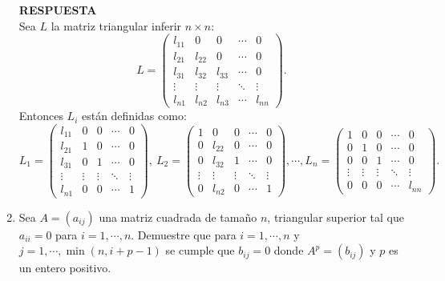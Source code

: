\documentclass[11pt,letterpaper]{article}
\newcommand{\res}{\textbf{RESPUESTA}\\}
\begin{document}
\begin{enumerate}
\res
Sea $L$ la matriz triangular inferir $n\times n$:
\begin{equation*}
L=\left( \begin{array}{ccccc}
l_{11}&0 & 0 & \cdots &0\\
l_{21}&l_{22}& 0 & \cdots & 0\\
l_{31}&l_{32}& l_{33}& \cdots & 0\\
\vdots & \vdots & \vdots & \ddots & \vdots\\
l_{n1}&l_{n2}&l_{n3}& \cdots & l_{nn}
\end{array}\right).
\end{equation*}	 
Entonces $L_i$ están definidas como:
\begin{equation*}
L_1=\left( \begin{array}{ccccc}
l_{11}&0 & 0 & \cdots &0\\
l_{21}&1& 0 & \cdots & 0\\
l_{31}&0&1& \cdots & 0\\
\vdots & \vdots & \vdots & \ddots & \vdots\\
l_{n1}&0&0& \cdots &1
\end{array}\right), \ L_2=\left( \begin{array}{ccccc}
1&0 & 0 & \cdots &0\\
0&l_{22}& 0 & \cdots & 0\\
0&l_{32}& 1& \cdots & 0\\
\vdots & \vdots & \vdots & \ddots & \vdots\\
0&l_{n2}&0& \cdots & 1
\end{array}\right), \cdots , L_n=\left( \begin{array}{ccccc}
1&0 & 0 & \cdots &0\\
0&1& 0 & \cdots & 0\\
0&0& 1& \cdots & 0\\
\vdots & \vdots & \vdots & \ddots & \vdots\\
0&0&0& \cdots & l_{nn}
\end{array}\right).
\end{equation*}


\item Sea $A=(a_{ij})$ una matriz cuadrada de tamaño $n$, triangular superior tal que $a_{ii}=0$ para $i=1, \cdots , n.$ Demuestre que para $i=1, \cdots , n$ y $j=1, \cdots , \min (n,i+p-1)$ se cumple que $b_{ij}=0$ donde $A^p=(b_{ij})$ y $p$ es un entero positivo. 


\end{enumerate}
\end{document}

